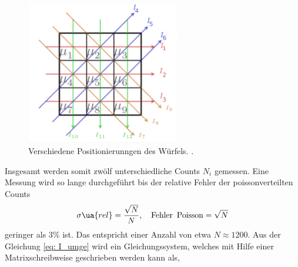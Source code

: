 \begin{figure}[h]
  \centering
  \includegraphics[width=0.6\textwidth]{pics/positionierung.pdf}
  \caption{Verschiedene Positionierunngen des Würfels. \cite{luckyjosh}.}
  \label{fig: positionierung}
\end{figure}

Insgesamt werden somit zwölf unterschiedliche Counts $N_i$ gemessen.
Eine Messung wird so lange durchgeführt bis der relative Fehler der poissonverteilten Counts
\begin{equation*}
  \sigma\ua{rel}=\frac{\sqrt{N}}{N}, \quad \text{Fehler\, Poisson}= \sqrt{N}
\end{equation*}
geringer als $3\%$ ist. Das entspricht einer Anzahl von etwa $N\approx 1200$.
Aus der Gleichung \eqref{eq: I_umge} wird ein Gleichungssystem, welches mit Hilfe einer
Matrixschreibweise geschrieben werden kann als,

